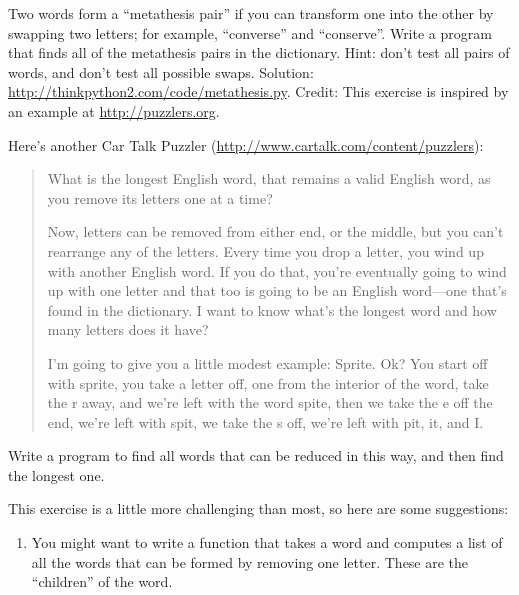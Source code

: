 \documentclass[10pt]{book}
\begin{document}
\begin{exercise}

Two words form a ``metathesis pair'' if you can transform one into the
other by swapping two letters; for example, ``converse'' and
``conserve''.  Write a program that finds all of the metathesis pairs
in the dictionary.  Hint: don't test all pairs of words, and don't
test all possible swaps.  Solution:
\url{http://thinkpython2.com/code/metathesis.py}.  Credit: This
exercise is inspired by an example at \url{http://puzzlers.org}.

\end{exercise}


\begin{exercise}

Here's another Car Talk Puzzler
(\url{http://www.cartalk.com/content/puzzlers}):

\begin{quote}
What is the longest English word, that remains a valid English word,
as you remove its letters one at a time?

Now, letters can be removed from either end, or the middle, but you
can't rearrange any of the letters. Every time you drop a letter, you
wind up with another English word. If you do that, you're eventually
going to wind up with one letter and that too is going to be an
English word---one that's found in the dictionary. I want to know
what's the longest word and how many letters does it
have?

I'm going to give you a little modest example: Sprite. Ok? You start
off with sprite, you take a letter off, one from the interior of the
word, take the r away, and we're left with the word spite, then we
take the e off the end, we're left with spit, we take the s off, we're
left with pit, it, and I.
\end{quote}

Write a program to find all words that can be reduced in this way,
and then find the longest one.

This exercise is a little more challenging than most, so here are
some suggestions:

\begin{enumerate}

\item You might want to write a function that takes a word and
  computes a list of all the words that can be formed by removing one
  letter.  These are the ``children'' of the word.


\end{enumerate}
\end{exercise}
\end{document}
